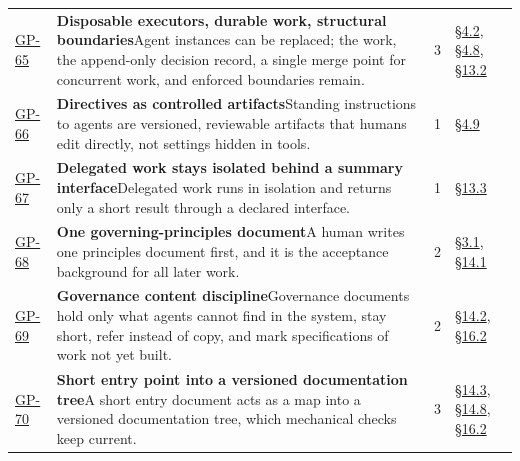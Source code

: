 \begin{longtable}{@{}p{} p{} r p{}@{}}
\hyperlink{gp-65}{GP-65}\hypertarget{gp-65}{} & \textbf{Disposable executors, durable work, structural boundaries}\newline Agent instances can be replaced; the work, the append-only decision record, a single merge point for concurrent work, and enforced boundaries remain.\rule[-\normalbaselineskip]{0pt}{0pt} & 3 & \hyperlink{nss-4.2}{\S4.2}, \hyperlink{nss-4.8}{\S4.8}, \hyperlink{nss-13.2}{\S13.2}\rule[-\normalbaselineskip]{0pt}{0pt} \\
\hyperlink{gp-66}{GP-66}\hypertarget{gp-66}{} & \textbf{Directives as controlled artifacts}\newline Standing instructions to agents are versioned, reviewable artifacts that humans edit directly, not settings hidden in tools.\rule[-\normalbaselineskip]{0pt}{0pt} & 1 & \hyperlink{nss-4.9}{\S4.9}\rule[-\normalbaselineskip]{0pt}{0pt} \\
\hyperlink{gp-67}{GP-67}\hypertarget{gp-67}{} & \textbf{Delegated work stays isolated behind a summary interface}\newline Delegated work runs in isolation and returns only a short result through a declared interface.\rule[-\normalbaselineskip]{0pt}{0pt} & 1 & \hyperlink{nss-13.3}{\S13.3}\rule[-\normalbaselineskip]{0pt}{0pt} \\
\hyperlink{gp-68}{GP-68}\hypertarget{gp-68}{} & \textbf{One governing-principles document}\newline A human writes one principles document first, and it is the acceptance background for all later work.\rule[-\normalbaselineskip]{0pt}{0pt} & 2 & \hyperlink{nss-3.1}{\S3.1}, \hyperlink{nss-14.1}{\S14.1}\rule[-\normalbaselineskip]{0pt}{0pt} \\
\hyperlink{gp-69}{GP-69}\hypertarget{gp-69}{} & \textbf{Governance content discipline}\newline Governance documents hold only what agents cannot find in the system, stay short, refer instead of copy, and mark specifications of work not yet built.\rule[-\normalbaselineskip]{0pt}{0pt} & 2 & \hyperlink{nss-14.2}{\S14.2}, \hyperlink{nss-16.2}{\S16.2}\rule[-\normalbaselineskip]{0pt}{0pt} \\
\hyperlink{gp-70}{GP-70}\hypertarget{gp-70}{} & \textbf{Short entry point into a versioned documentation tree}\newline A short entry document acts as a map into a versioned documentation tree, which mechanical checks keep current.\rule[-\normalbaselineskip]{0pt}{0pt} & 3 & \hyperlink{nss-14.3}{\S14.3}, \hyperlink{nss-14.8}{\S14.8}, \hyperlink{nss-16.2}{\S16.2}\rule[-\normalbaselineskip]{0pt}{0pt} \\

\end{longtable}
